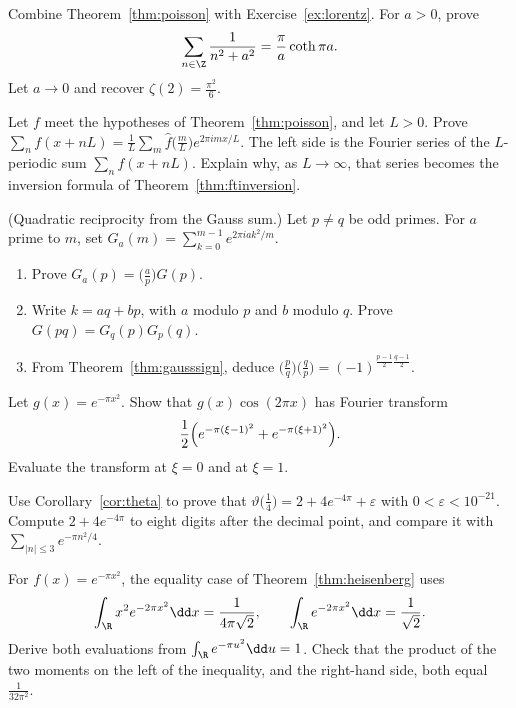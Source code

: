 \begin{exercise}[$\star\star$]\label{ex:coth}
Combine Theorem~\ref{thm:poisson} with Exercise~\ref{ex:lorentz}. For $a>0$, prove
\[
\sum_{n\in\Z}\frac1{n^2+a^2}=\frac\pi a\coth\pi a.
\]
Let $a\to0$ and recover $\zeta(2)=\frac{\pi^2}6$.
\end{exercise}

\begin{exercise}[$\star\star$]\label{ex:periodize}
Let $f$ meet the hypotheses of Theorem~\ref{thm:poisson}, and let $L>0$. Prove $\sum_nf(x+nL)=\frac1L\sum_m\hat f\bigl(\frac mL\bigr)e^{2\pi imx/L}$. The left side is the Fourier series of the $L$-periodic sum $\sum_nf(x+nL)$. Explain why, as $L\to\infty$, that series becomes the inversion formula of Theorem~\ref{thm:ftinversion}.
\end{exercise}

\begin{exercise}[$\star\star\star$]\label{ex:reciprocity}
(Quadratic reciprocity from the Gauss sum.) Let $p\ne q$ be odd primes. For $a$ prime to $m$, set $G_a(m)=\sum_{k=0}^{m-1}e^{2\pi iak^2/m}$.
\begin{enumerate}[label=(\alph*)]
\item Prove $G_a(p)=\bigl(\frac ap\bigr)G(p)$.
\item Write $k=aq+bp$, with $a$ modulo $p$ and $b$ modulo $q$. Prove $G(pq)=G_q(p)G_p(q)$.
\item From Theorem~\ref{thm:gausssign}, deduce $\bigl(\frac pq\bigr)\bigl(\frac qp\bigr)=(-1)^{\frac{p-1}2\frac{q-1}2}$.
\end{enumerate}
\end{exercise}

\begin{exercise}[$\star$]\label{ex:rw08a}
Let $g(x)=e^{-\pi x^2}$. Show that $g(x)\cos(2\pi x)$ has Fourier transform
\[
\frac12\Bigl(e^{-\pi(\xi-1)^2}+e^{-\pi(\xi+1)^2}\Bigr).
\]
Evaluate the transform at $\xi=0$ and at $\xi=1$.
\end{exercise}

\begin{exercise}[$\star\star$]\label{ex:rw08b}
Use Corollary~\ref{cor:theta} to prove that $\vartheta\bigl(\frac14\bigr)=2+4e^{-4\pi}+\varepsilon$ with $0<\varepsilon<10^{-21}$. Compute $2+4e^{-4\pi}$ to eight digits after the decimal point, and compare it with $\sum_{|n|\le 3}e^{-\pi n^2/4}$.
\end{exercise}

\begin{exercise}[$\star\star$]\label{ex:rw08c}
For $f(x)=e^{-\pi x^2}$, the equality case of Theorem~\ref{thm:heisenberg} uses
\[
\int_{\R}x^2e^{-2\pi x^2}\dd x=\frac1{4\pi\sqrt2},\qquad\int_{\R}e^{-2\pi x^2}\dd x=\frac1{\sqrt2}.
\]
Derive both evaluations from $\int_{\R}e^{-\pi u^2}\dd u=1$. Check that the product of the two moments on the left of the inequality, and the right-hand side, both equal $\frac1{32\pi^2}$.
\end{exercise}

